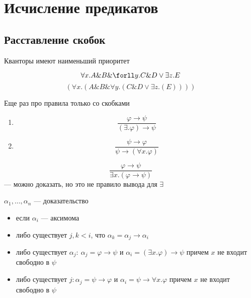 \documentclass[oneside]{book}
\begin{document}
\section{Исчисление предикатов}
\label{sec:orgc3b625b}
\subsection{Расставление скобок}
\label{sec:org696dd63}
Кванторы имеют наименьший приоритет
\begin{examp}
	\[ \forall x. A \& B \& \forll y. C \& D \vee \exists z. E \]
	\[ (\forall x. (A \& B \& \forall y. (C \& D \vee \exists z. (E)))) \]
\end{examp}
Еще раз про правила только со скобками
\begin{enumerate}
	\item \[ \frac{\varphi \to \psi}{(\exists. \varphi) \to \psi} \]
	\item \[ \frac{\psi \to \varphi}{\psi \to (\forall x. \varphi)} \]
\end{enumerate}
\begin{examp}
	\[ \frac{\varphi \to \psi}{\exists x.(\varphi \to \psi)} \]
	--- можно доказать, но это не правило вывода для \(\exists\)
\end{examp}
\begin{definition}
	\-
	\(\alpha_1, \dots, \alpha_n\) --- доказательство
	\begin{itemize}
		\item если \(\alpha_i\) --- аксимома
		\item либо существует \(j, k < i\), что \(\alpha_k = \alpha_j \to \alpha_i\)
		\item либо существует \(\alpha_j:\ \alpha_j = \varphi \to \psi\) и \(\alpha_i = (\exists x. \varphi) \to \psi\) причем \(x\) не входит свободно в \(\psi\)
		\item либо существует \(j: \alpha_j = \psi \to \varphi\) и \(\alpha_i = \psi \to \forall x. \varphi\) причем \(x\) не входит свободно в \(\psi\)
	\end{itemize}
\end{definition}
\end{document}
